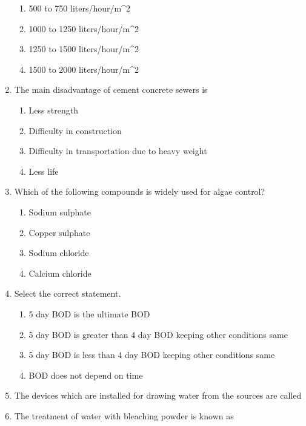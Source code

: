 \documentclass[11pt,a4paper]{article}
\begin{document}
\begin{enumerate}
\begin{enumerate}[label=\Alph*.]
\item{500 to 750 liters/hour/m\^{}2}
\item{1000 to 1250 liters/hour/m\^{}2}
\item{1250 to 1500 liters/hour/m\^{}2}
\item{1500 to 2000 liters/hour/m\^{}2}
\end{enumerate}
\item{The main disadvantage of cement concrete sewers is}
\begin{enumerate}[label=\Alph*.]
\item{Less strength}
\item{Difficulty in construction}
\item{Difficulty in transportation due to heavy weight}
\item{Less life}
\end{enumerate}
\item{Which of the following compounds is widely used for algae control?}
\begin{enumerate}[label=\Alph*.]
\item{Sodium sulphate}
\item{Copper sulphate}
\item{Sodium chloride}
\item{Calcium chloride}
\end{enumerate}
\item{Select the correct statement.}
\begin{enumerate}[label=\Alph*.]
\item{5 day BOD is the ultimate BOD}
\item{5 day BOD is greater than 4 day BOD keeping other conditions same}
\item{5 day BOD is less than 4 day BOD keeping other conditions same}
\item{BOD does not depend on time}
\end{enumerate}
\item{The devices which are installed for drawing water from the sources are called}
\\
\item{The treatment of water with bleaching powder is known as}

\end{enumerate}
\end{document}
